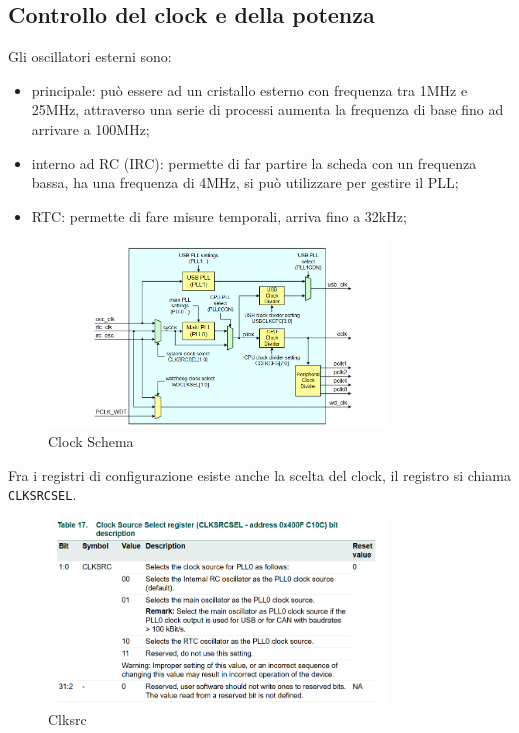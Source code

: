 \documentclass[12pt]{article}
\begin{document}
\subsection{Controllo del clock e della potenza}
Gli oscillatori esterni sono:
\begin{itemize}
    \item principale: pu\`o essere ad un cristallo esterno con frequenza tra 1MHz e 25MHz, attraverso una serie di processi aumenta la frequenza di base fino ad arrivare a 100MHz;
    \item interno ad RC (IRC): permette di far partire la scheda con un frequenza bassa, ha una frequenza di 4MHz, si pu\`o utilizzare per gestire il PLL;
    \item RTC: permette di fare misure temporali, arriva fino a 32kHz;
\end{itemize}
\begin{figure}[H]
    \centering
    \includegraphics[width=0.8\textwidth]{clock-schema.png}
    \caption{Clock Schema}
    \label{fig:clock-schema}
\end{figure}
Fra i registri di configurazione esiste anche la scelta del clock, il registro si chiama \texttt{CLKSRCSEL}.
\begin{figure}[H]
    \centering
    \includegraphics[width=0.8\textwidth]{clksrc.png}
    \caption{Clksrc}
    \label{fig:clksrc}
\end{figure}
\end{document}

